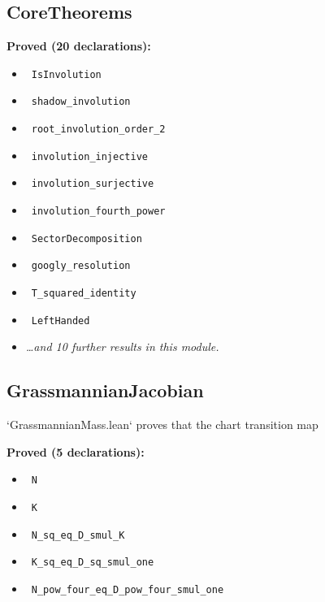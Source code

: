 \documentclass{report}
\theoremstyle{definition}
\begin{document}
\begin{itemize}
\begin{itemize}
\subsection{CoreTheorems}
\noindent\textbf{Proved (20 declarations):}
\begin{itemize}
  \item {}\leanok\ \texttt{IsInvolution}
  \item {}\leanok\ \texttt{shadow\_involution}
  \item {}\leanok\ \texttt{root\_involution\_order\_2}
  \item {}\leanok\ \texttt{involution\_injective}
  \item {}\leanok\ \texttt{involution\_surjective}
  \item {}\leanok\ \texttt{involution\_fourth\_power}
  \item {}\leanok\ \texttt{SectorDecomposition}
  \item {}\leanok\ \texttt{googly\_resolution}
  \item {}\leanok\ \texttt{T\_squared\_identity}
  \item {}\leanok\ \texttt{LeftHanded}
  \item \emph{\ldots and 10 further results in this module.}
\end{itemize}

\subsection{GrassmannianJacobian}
`GrassmannianMass.lean` proves that the chart transition map

\noindent\textbf{Proved (5 declarations):}
\begin{itemize}
  \item {}\leanok\ \texttt{N}
  \item {}\leanok\ \texttt{K}
  \item {}\leanok\ \texttt{N\_sq\_eq\_D\_smul\_K}
  \item {}\leanok\ \texttt{K\_sq\_eq\_D\_sq\_smul\_one}
  \item {}\leanok\ \texttt{N\_pow\_four\_eq\_D\_pow\_four\_smul\_one}
\end{itemize}


\end{itemize}
\end{itemize}
\end{document}
